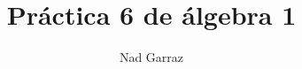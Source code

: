 

\usetikzlibrary{decorations.pathreplacing}





\pagestyle{empty} %

\title{Práctica 6 de álgebra 1} %
\author{Nad Garraz} %
\date{\update} %

\maketitle  %

\newpage

